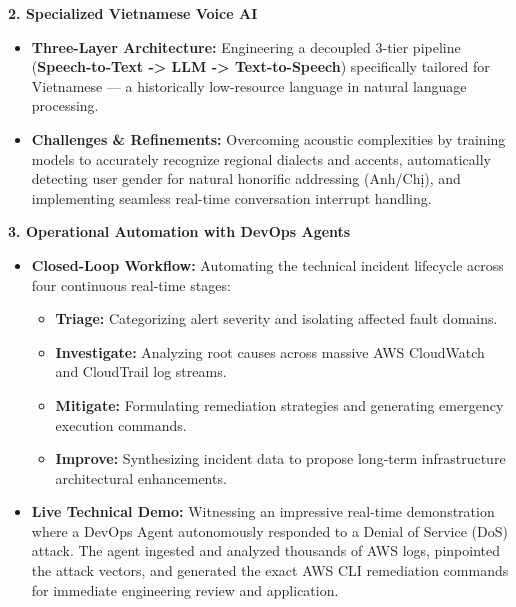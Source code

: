 \vspace{0.5em}\noindent\textbf{2. Specialized Vietnamese Voice AI}

\begin{itemize}
\tightlist
\item
  \textbf{Three-Layer Architecture:} Engineering a decoupled 3-tier
  pipeline (\textbf{Speech-to-Text -\textgreater{} LLM -\textgreater{}
  Text-to-Speech}) specifically tailored for Vietnamese --- a
  historically low-resource language in natural language processing.
\item
  \textbf{Challenges \& Refinements:} Overcoming acoustic complexities
  by training models to accurately recognize regional dialects and
  accents, automatically detecting user gender for natural honorific
  addressing (Anh/Chị), and implementing seamless real-time conversation
  interrupt handling.
\end{itemize}

\vspace{0.5em}\noindent\textbf{3. Operational Automation with DevOps Agents}

\begin{itemize}
\tightlist
\item
  \textbf{Closed-Loop Workflow:} Automating the technical incident
  lifecycle across four continuous real-time stages:

  \begin{itemize}
  \tightlist
  \item
    \textbf{Triage:} Categorizing alert severity and isolating affected
    fault domains.
  \item
    \textbf{Investigate:} Analyzing root causes across massive AWS
    CloudWatch and CloudTrail log streams.
  \item
    \textbf{Mitigate:} Formulating remediation strategies and generating
    emergency execution commands.
  \item
    \textbf{Improve:} Synthesizing incident data to propose long-term
    infrastructure architectural enhancements.
  \end{itemize}
\item
  \textbf{Live Technical Demo:} Witnessing an impressive real-time
  demonstration where a DevOps Agent autonomously responded to a Denial
  of Service (DoS) attack. The agent ingested and analyzed thousands of
  AWS logs, pinpointed the attack vectors, and generated the exact AWS
  CLI remediation commands for immediate engineering review and
  application.
\end{itemize}

